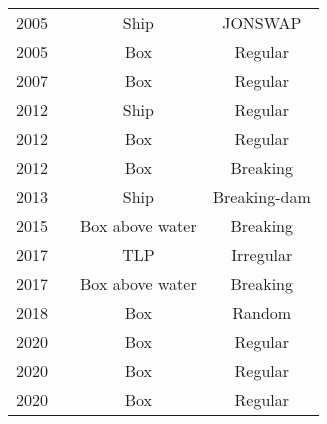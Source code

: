\begin{table}[]
\begin{tabular}{ll|cc}
		2005                                   & \citet{Soares2005}                              & Ship                                        & JONSWAP                               \\
		2005                                   & \citet{Greco2005}                               & Box                                         & Regular                                 \\
		2007                                   & \citet{Greco2007}                               & Box                                         & Regular                                  \\
		2012                                   & \citet{Greco2012}                               & Ship                                        & Regular                                \\
		2012                                   & \citet{Lee2012}                                & Box                                         & Regular                                 \\
		2012                                   & \citet{Ariyarathne2012}                         & Box                                         & Breaking                                \\
		2013                                   & \citet{Liut2013}                                & Ship                                        & Breaking-dam                              \\
		2015                                   & \citet{Song2015}                                & Box above water                                         & Breaking                               \\
		2017                                   & \citet{Abdussamie2017}                          & TLP                                         & Irregular                               \\
		2017                                   & \citet{Scharnke2017}                            & Box above water                                         & Breaking                                \\
		2018                                   & \citet{Chuang2018}                              & Box                                         & Random                               \\
		2020                                   & \citet{Lee2020}                                 & Box                                         & Regular                                 \\
		2020                                   & \citet{Hernandez-Fontes2020}                    & Box                                         & Regular                               \\
		2020                                   & \citet{Hernandez-Fontes2020a}                   & Box                                         & Regular                                  
	\end{tabular}
\label{tab:all_exp_greenwater}
\end{table}


